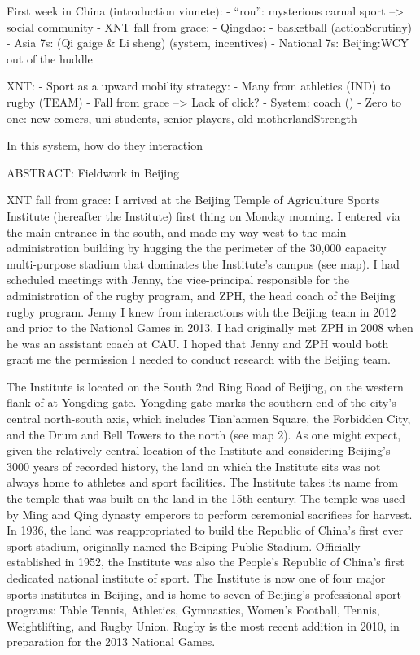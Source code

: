First week in China (introduction vinnete):
- ``rou'': mysterious carnal sport --> social community
- XNT fall from grace:
- Qingdao:
    - basketball (actionScrutiny)
    - Asia 7s: (Qi gaige & Li sheng) (system, incentives)
    - National 7s: Beijing:WCY out of the huddle


XNT:
- Sport as a upward mobility strategy:
    - Many from athletics (IND) to rugby (TEAM)
- Fall from grace --> Lack of click?
- System: coach ()
- Zero to one: new comers, uni students, senior players, old motherlandStrength

In this system, how do they interaction

ABSTRACT:
Fieldwork in Beijing


















XNT fall from grace:
I arrived at the Beijing Temple of Agriculture Sports Institute (hereafter the Institute) first thing on Monday morning. I entered via the main entrance in the south, and made my way west to the main administration building by hugging the the perimeter of the 30,000 capacity multi-purpose stadium that dominates the Institute's campus (see map).  I had scheduled meetings with Jenny, the vice-principal responsible for the administration of the rugby program, and ZPH, the head coach of the Beijing rugby program. Jenny I knew from interactions with the Beijing team in 2012 and prior to the National Games in 2013. I had originally met ZPH in 2008 when he was an assistant coach at CAU.  I hoped that Jenny and ZPH would both grant me the permission I needed to conduct research with the Beijing team.

The Institute is located on the South 2nd Ring Road of Beijing, on the western flank of at Yongding gate. Yongding gate marks the southern end of the city's central north-south axis, which includes Tian'anmen Square, the Forbidden City, and the Drum and Bell Towers to the north (see map 2).  As one might expect, given the relatively central location of the Institute and considering Beijing's 3000 years of recorded history, the land on which the Institute sits was not always home to athletes and sport facilities.  The Institute takes its name from the temple that was built on the land in the 15th century.  The temple was used by Ming and Qing dynasty emperors to perform ceremonial sacrifices for harvest. In 1936, the land was reappropriated to build the Republic of China's first ever sport stadium, originally named the Beiping Public Stadium.  Officially established in 1952, the Institute was also the People's Republic of China's first dedicated national institute of sport.  The Institute is now one of four major sports institutes in Beijing, and is home to seven of Beijing's professional sport programs: Table Tennis, Athletics, Gymnastics, Women's Football, Tennis, Weightlifting, and Rugby Union.  Rugby is the most recent addition in 2010, in preparation for the 2013 National Games.

